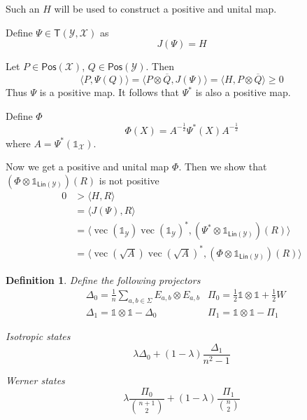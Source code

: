\documentclass[aps,pra,onecolumn,notitlepage,superscriptaddress]{revtex4-1}
\newcommand{\spc}[1]{\mathcal{#1}}
\newcommand{\Lin}{\mathsf{Lin}}
\newcommand{\Pos}{\mathsf{Pos}}
\newcommand{\T}{\mathsf{T}}
\def\>{\rangle}
\def\<{\langle}
\newcommand{\op}[1]{\operatorname{#1}}
\newcommand\I{\mathds{1}}
\newtheorem{defi}{Definition}
\begin{document}
    Such an $H$ will be used to construct a positive and unital map.

    Define $\Psi \in \T(\spc Y, \spc X)$ as
    \begin{equation}
        J(\Psi) = H
    \end{equation}

    Let $P \in \Pos(\spc X)$, $Q \in \Pos(\spc Y)$. Then
    \begin{equation}
        \<P, \Psi(Q)\> = \< P \otimes \overline Q, J(\Psi) \> = \< H, P \otimes \overline Q \> \geq 0
    \end{equation}
    Thus $\Psi$ is a positive map. It follows that $\Psi^*$ is also a positive map.

    Define $\Phi$
    \begin{equation}
        \Phi(X) = A^{-\frac 1 2} \Psi^*(X) A^{-\frac 1 2}
    \end{equation}
    where $A = \Psi^*(\I_{\spc X})$.

    Now we get a positive and unital map $\Phi$. Then we show that $(\Phi \otimes \I_{\Lin (\spc Y)})(R)$ is not positive
    \begin{align*}
        0
        &> \< H, R \> \\
        &= \< J(\Psi), R \> \\
        &= \< \op{vec}(\I_{\spc Y}) \op{vec}(\I_{\spc Y})^*, (\Psi^* \otimes \I_{\Lin (\spc Y)})(R) \> \\
        &= \< \op{vec}(\sqrt{A})\op{vec}(\sqrt{A})^*, (\Phi \otimes \I_{\Lin(\spc Y)})(R) \>
    \end{align*}

    \begin{defi}
        Define the following projectors
        \begin{align*}
            &\Delta_0 = \frac 1 n \sum_{a,b \in \Sigma} E_{a,b} \otimes E_{a,b} & \Pi_0 = \frac 1 2 \I \otimes \I + \frac 1 2 W \\
            &\Delta_1 = \I \otimes \I - \Delta_0 & \Pi_1 = \I \otimes \I - \Pi_1
        \end{align*}

        Isotropic states
        \begin{equation}
            \lambda \Delta_0 + (1-\lambda) \frac{\Delta_1}{n^2-1}
        \end{equation}

        Werner states
        \begin{equation}
            \lambda \frac{\Pi_0}{\binom{n+1}{2}} +
            (1-\lambda) \frac{\Pi_1}{\binom{n}{2}}
        \end{equation}
    \end{defi}
    
\end{document}
